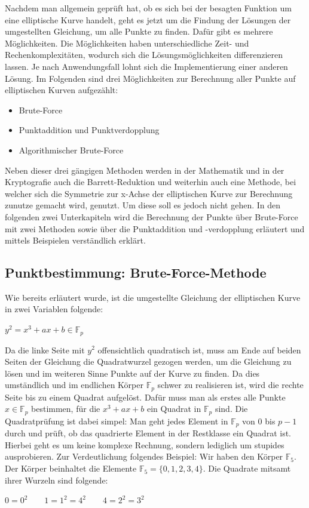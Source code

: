 Nachdem man allgemein geprüft hat, ob es sich bei der besagten Funktion um eine elliptische Kurve handelt, geht es jetzt um die Findung der Lösungen der umgestellten Gleichung, um alle Punkte zu finden. Dafür gibt es mehrere Möglichkeiten. Die Möglichkeiten haben unterschiedliche Zeit- und Rechenkomplexitäten, wodurch sich die Lösungsmöglichkeiten differenzieren lassen. Je nach Anwendungsfall lohnt sich die Implementierung einer anderen Lösung. Im Folgenden sind drei Möglichkeiten zur Berechnung aller Punkte auf elliptischen Kurven aufgezählt:

\begin{itemize}
\item Brute-Force
\item Punktaddition und Punktverdopplung
\item Algorithmischer Brute-Force
\end{itemize}

Neben dieser drei gängigen Methoden werden in der Mathematik und in der Kryptografie auch die Barrett-Reduktion und weiterhin auch eine Methode, bei welcher sich die Symmetrie zur x-Achse der elliptischen Kurve zur Berechnung zunutze gemacht wird, genutzt. Um diese soll es jedoch nicht gehen. In den folgenden zwei Unterkapiteln wird die Berechnung der Punkte über Brute-Force mit zwei Methoden sowie über die Punktaddition und -verdopplung erläutert und mittels Beispielen verständlich erklärt.

\subsection{Punktbestimmung: Brute-Force-Methode}\label{sec:brute_force}
Wie bereits erläutert wurde, ist die umgestellte Gleichung der elliptischen Kurve in zwei Variablen folgende:
\begin{center}
$y^{2} =  x^{3} + ax + b  \in \mathbb{F}_{p}$
\end{center}

Da die linke Seite mit $y^{2}$ offensichtlich quadratisch ist, muss am Ende auf beiden Seiten der Gleichung die Quadratwurzel gezogen werden, um die Gleichung zu lösen und im weiteren Sinne Punkte auf der Kurve zu finden. Da dies umständlich und im endlichen Körper $\mathbb{F}_{p}$ schwer zu realisieren ist, wird die rechte Seite bis zu einem Quadrat aufgelöst. Dafür muss man als erstes alle Punkte $x \in \mathbb{F}_{p}$ bestimmen, für die $x^{3} + ax + b$ ein Quadrat in $\mathbb{F}_{p}$ sind. Die Quadratprüfung ist dabei simpel: Man geht jedes Element in $\mathbb{F}_{p}$ von $0$ bis $p - 1$ durch und prüft, ob das quadrierte Element in der Restklasse ein Quadrat ist. Hierbei geht es um keine komplexe Rechnung, sondern lediglich um stupides ausprobieren. Zur Verdeutlichung folgendes Beispiel: Wir haben den Körper $\mathbb{F}_{5}$. Der Körper beinhaltet die Elemente $\mathbb{F}_{5} = \{0, 1, 2, 3, 4\}$. Die Quadrate mitsamt ihrer Wurzeln sind folgende:
\begin{center}
$0 = 0^{2} \qquad 1 = 1^{2} = 4^{2} \qquad 4 = 2^{2} = 3^{2}$
\end{center}

